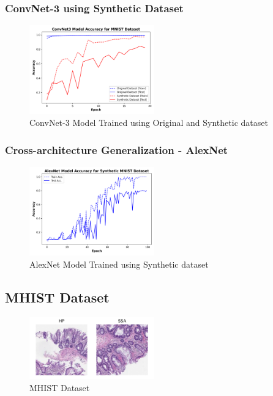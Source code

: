 \documentclass[conference, compsoc]{IEEEtran}
\begin{document}
\subsubsection{ConvNet-3 using Synthetic Dataset}
\begin{figure}[H]
	\centering
	\includegraphics[width=0.48\textwidth]{mnist_syn_acc.png}
	\caption{ConvNet-3 Model Trained using Original and Synthetic dataset}
	\label{fig:mnist_syn_acc}
\end{figure}
\subsubsection{Cross-architecture Generalization - AlexNet}
\begin{figure}[H]
	\centering
	\includegraphics[width=0.48\textwidth]{mnist_alex_acc.png}
	\caption{AlexNet Model Trained using Synthetic dataset}
	\label{fig:mnist_alex_acc}
\end{figure}
\subsection{MHIST Dataset}
\begin{figure}[H]
	\centering
	\includegraphics[width=0.48\textwidth]{MHIST_dataset.png}
	\caption{MHIST Dataset \cite{wei2021petri}}
	\label{fig:mhist_dataset}
\end{figure}
\end{document}
